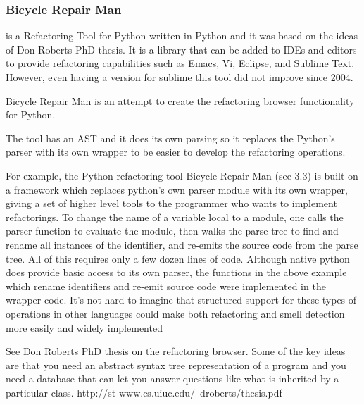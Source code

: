 
\subsubsection{Bicycle Repair Man}

 is a Refactoring Tool for Python written in Python and it was based on the ideas of Don Roberts PhD thesis. 
 It is a library that can be added to IDEs and editors to provide refactoring capabilities such as Emacs, Vi, Eclipse, and Sublime Text. 
 However, even having a version for sublime this tool did not improve since 2004.

Bicycle Repair Man is an attempt to create the refactoring browser functionality for Python. 

The tool has an AST and it does its own parsing so it replaces the Python's parser with its own wrapper to be easier to develop the refactoring operations.




For example, the Python refactoring tool Bicycle Repair Man (see 3.3) is
built on a framework which replaces python’s own parser module with its own
wrapper, giving a set of higher level tools to the programmer who wants to
implement refactorings. To change the name of a variable local to a module, one
calls the parser function to evaluate the module, then walks the parse tree to find
and rename all instances of the identifier, and re-emits the source code from the
parse tree. All of this requires only a few dozen lines of code. Although native
python does provide basic access to its own parser, the functions in the above
example which rename identifiers and re-emit source code were implemented in
the wrapper code. It’s not hard to imagine that structured support for these
types of operations in other languages could make both refactoring and smell
detection more easily and widely implemented

See Don Roberts PhD thesis on the refactoring browser. Some of the key ideas are that you need an abstract syntax tree representation of a program and you need a database that can let you answer questions like what is inherited by a particular class. http://st-www.cs.uiuc.edu/~droberts/thesis.pdf